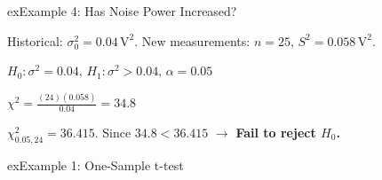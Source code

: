 \begin{PSbox}[unbreakable]{ex}{Example 4: Has Noise Power Increased?}

Historical: $\sigma_{0}^{2} = 0.04\,\mathrm{V}^{2}$. New measurements: $n = 25,\, S^{2} = 0.058\,\mathrm{V}^{2}$.

$H_{0}: \sigma^{2} = 0.04,\, H_{1}: \sigma^{2} > 0.04,\, \alpha = 0.05$

$\displaystyle \chi^{2} = \frac{(24)(0.058)}{0.04} = 34.8$

$\chi^{2}_{0.05, 24} = 36.415$. Since $34.8 < 36.415$ \ensuremath{\to} \textbf{Fail to reject $H_{0}$.}

\end{PSbox}


\begin{PSbox}[unbreakable]{ex}{Example 1: One-Sample t-test}


\begin{Shaded}
\begin{Highlighting}[]
 \OperatorTok{=}\NormalTok{ [}\OperatorTok{,} \OperatorTok{{-}}\OperatorTok{,} \OperatorTok{,} \OperatorTok{,} \OperatorTok{{-}}\OperatorTok{,} \OperatorTok{,} \OperatorTok{,} 
        \OperatorTok{,} \OperatorTok{,} \OperatorTok{{-}}\OperatorTok{,} \OperatorTok{,} \OperatorTok{,} \OperatorTok{,} \OperatorTok{{-}}\OperatorTok{,} 
        \OperatorTok{,} \OperatorTok{,} \OperatorTok{,} \OperatorTok{,} \OperatorTok{{-}}\OperatorTok{,} \NormalTok{]}\OperatorTok{;}

 \OperatorTok{=} \OperatorTok{;}  
\NormalTok{[}\OperatorTok{,} \OperatorTok{,} \OperatorTok{,} \NormalTok{] }\OperatorTok{=} \NormalTok{(}\OperatorTok{,} \NormalTok{)}\OperatorTok{;}


\end{Highlighting}
\end{Shaded}
\end{PSbox}
